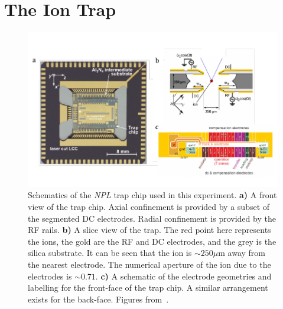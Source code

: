\section{The Ion Trap}
\label{sec:The Ion Trap}

    \begin{figure}
        \begin{center}
        \noindent\includegraphics[width=\linewidth]{figures/pdf_figure/NPL_trap.pdf}
        \end{center}
        \caption{
            Schematics of the \emph{NPL} trap chip used in this experiment.
            \textbf{a)} A front view of the trap chip. Axial confinement is provided by a subset of the segmented DC electrodes. Radial confinement is provided by the RF rails. 
            \textbf{b)} A slice view of the trap. The red point here represents the ions, the gold are the RF and DC electrodes, and the grey is the silica substrate. It can be seen that the ion is $\sim 250 \mu$m away from the nearest electrode. The numerical aperture of the ion due to the electrodes is $\sim 0.71$.
            \textbf{c)} A schematic of the electrode geometries and labelling for the front-face of the trap chip. A similar arrangement exists for the back-face. 
            Figures from~\cite{choonee2017silicon}.
        \label{fig:trap}}
    \end{figure}


